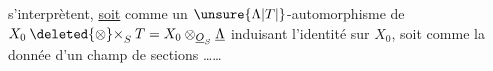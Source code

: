 s'interprètent, \uline{soit} comme un $\unsure{\Lambda|T|{}}$-automorphisme de $X_0\mathbin{\deleted{\otimes}\times}_S T=X_0\otimes_{\underline{O}_S}\underline\Lambda$ induisant l'identité sur $X_0$, soit comme la donnée d'un champ de sections  \ldots\ldots
\margin{\unsure{---}}

